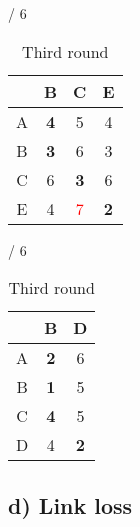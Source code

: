 \documentclass[a4paper, 11 pt, article, accentcolor=tud7b]{tudreport}
\begin{document}
\begin{table}[h]
\begin{subtable}[b]{\textwidth / 6}
\begin{tabular}{| c | c | c | c |}
	    \hline
	      & B                   & C           & E                  \\ \hline
	    A & \textbf{4}          & 5           & 4                  \\ \hline
	    B & \textbf{3}          & 6           & 3                  \\ \hline
	    C & 6                   & \textbf{3}  & 6                  \\ \hline
	    E & 4                   & \textcolor{red}{7} & \textbf{2}  \\ \hline
	    \end{tabular}
	    \caption{$D^{D}$}
	  \end{subtable}
	  \hfill
	  \begin{subtable}[b]{\textwidth / 6}
	    \begin{tabular}{| c | c | c |}
	    \hline
	      & B                   & D                    \\ \hline
	    A & \textbf{2}          & 6                    \\ \hline
	    B & \textbf{1}          & 5                    \\ \hline
	    C & \textbf{4}          & 5                    \\ \hline
	    D & 4                   & \textbf{2}           \\ \hline
	    \end{tabular}
	    \caption{$D^{E}$}
	  \end{subtable}
	  \caption{Third round}
	\end{table}
	
	\newpage
	
	\subsection*{d) Link loss}
	
\end{document}
